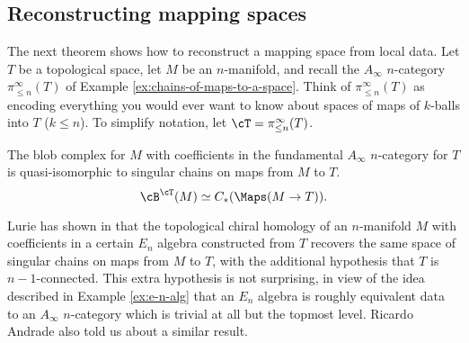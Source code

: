 \medskip

\subsection{Reconstructing mapping spaces}
\label{sec:map-recon}

The next theorem shows how to reconstruct a mapping space from local data.
Let $T$ be a topological space, let $M$ be an $n$-manifold, 
and recall the $A_\infty$ $n$-category $\pi^\infty_{\leq n}(T)$ 
of Example \ref{ex:chains-of-maps-to-a-space}.
Think of $\pi^\infty_{\leq n}(T)$ as encoding everything you would ever
want to know about spaces of maps of $k$-balls into $T$ ($k\le n$).
To simplify notation, let $\cT = \pi^\infty_{\leq n}(T)$.

\begin{thm}
\label{thm:map-recon}
The blob complex for $M$ with coefficients in the fundamental $A_\infty$ $n$-category for $T$ 
is quasi-isomorphic to singular chains on maps from $M$ to $T$.
$$\cB^\cT(M) \simeq C_*(\Maps(M\to T)).$$
\end{thm}
\begin{rem}
Lurie has shown in \cite[Theorem 3.8.6]{0911.0018} that the topological chiral homology 
of an $n$-manifold $M$ with coefficients in a certain $E_n$ algebra constructed from $T$ recovers 
the same space of singular chains on maps from $M$ to $T$, with the additional hypothesis that $T$ is $n-1$-connected.
This extra hypothesis is not surprising, in view of the idea described in Example \ref{ex:e-n-alg} 
that an $E_n$ algebra is roughly equivalent data to an $A_\infty$ $n$-category which 
is trivial at all but the topmost level.
Ricardo Andrade also told us about a similar result.
\end{rem}

